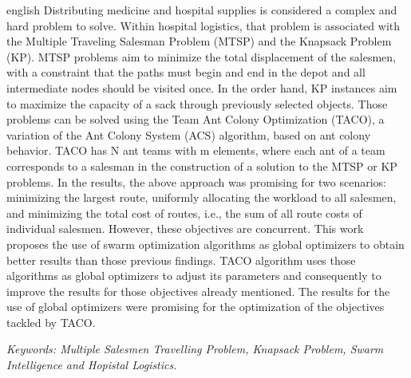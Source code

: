 \begin{resumo}[Abstract]
 \begin{otherlanguage*}{english}
  Distributing medicine and hospital supplies is considered a complex and hard problem to solve. Within hospital logistics, that problem is associated with the Multiple Traveling Salesman Problem (MTSP) and the Knapsack Problem (KP). MTSP problems aim to minimize the total displacement of the salesmen, with a constraint that the paths must begin and end in the depot and all intermediate nodes should be visited once. In the order hand, KP instances aim to maximize the capacity of a sack through previously selected objects. Those problems can be solved using the Team Ant Colony Optimization (TACO), a variation of the Ant Colony System (ACS) algorithm, based on ant colony behavior. TACO has N ant teams with m elements, where each ant of a team corresponds to a salesman in the construction of a solution to the MTSP or KP problems. In the results, the above approach was promising for two scenarios: minimizing the largest route, uniformly allocating the workload to all salesmen, and minimizing the total cost of routes, i.e., the sum of all route costs of individual salesmen. However, these objectives are concurrent. This work proposes the use of swarm optimization algorithms as global optimizers to obtain better results than those previous findings. TACO algorithm uses those algorithms as global optimizers to adjust its parameters and consequently to improve the results for those objectives already mentioned. The results for the use of global optimizers were promising for the optimization of the objectives tackled by TACO.

  \textit{Keywords: Multiple Salesmen Travelling Problem, Knapsack Problem, Swarm Intelligence and Hopistal Logistics.}

   \vspace{\onelineskip}
 
   \noindent 
 \end{otherlanguage*}
\end{resumo}

 

  
